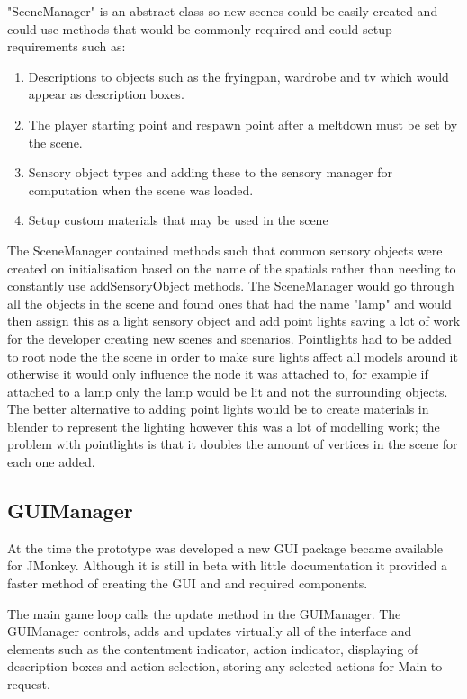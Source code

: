 "SceneManager" is an abstract class so new scenes could be easily created and could use methods that would be commonly required and could setup requirements such as:

\begin{enumerate}
\item Descriptions to objects such as the fryingpan, wardrobe and tv which would appear as description boxes. 
\item The player starting point and respawn point after a meltdown must be set by the scene. 
\item Sensory object types and adding these to the sensory manager for computation when the scene was loaded. 
\item Setup custom materials that may be used in the scene
\end{enumerate}

The SceneManager contained methods such that common sensory objects were created on initialisation based on the name of the spatials rather than needing to constantly use addSensoryObject methods. The SceneManager would go through all the objects in the scene and found ones that had the name "lamp" and would then assign this as a light sensory object and add point lights saving a lot of work for the developer creating new scenes and scenarios. Pointlights had to be added to root node the the scene in order to make sure lights affect all models around it otherwise it would only influence the node it was attached to, for example if attached to a lamp only the lamp would be lit and not the surrounding objects. The better alternative to adding point lights would be to create materials in blender to represent the lighting however this was a lot of modelling work; the problem with pointlights is that it doubles the amount of vertices in the scene for each one added.

\subsection{GUIManager}
At the time the prototype was developed a new GUI package became available for JMonkey. Although it is still in beta with little documentation it provided a faster method of creating the GUI and and required components. 

The main game loop calls the update method in the GUIManager. The GUIManager controls, adds and updates virtually all of the interface and elements such as the contentment indicator, action indicator, displaying of description boxes and action selection, storing any selected actions for Main to request. 

